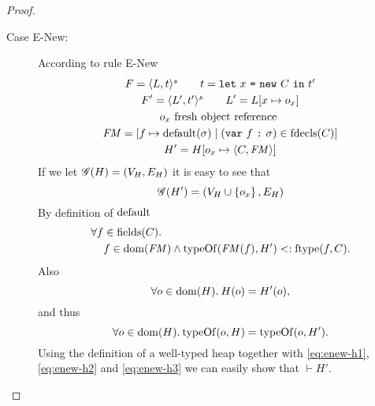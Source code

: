 \begin{proof}
\begin{description}
\begin{description}
\begin{description}
            \item[Case {\sc E-New}:] According to rule {\sc E-New}
              \begin{equation} \label{eq:enew1}
                \begin{gathered} 
                  F = \mbox{$\langle L, t \rangle^s$} \quad\quad t = \mbox{\mdseries\texttt{let}~$x$~\texttt{=}~$\mbox{\mdseries\texttt{new}~$C$}$~\texttt{in}~$t'$} \\
                  F' = \mbox{$\langle L', t' \rangle^s$} \quad\quad L' = L[x \mapsto o_x] \\
                  o_x \text{ fresh object reference } \\
                  \mathit{FM} = [f \mapsto \mbox{$\mathrm{default}$}(\sigma) \mid (\mbox{\mdseries\texttt{var}~$f$~\texttt{:}~$\sigma$}) \in
                  \mbox{$\mathrm{fdecls}$}(C)] \\
                  H' = H[o_x \mapsto \mbox{$\langle C, \mathit{FM} \rangle$}]
                \end{gathered}
              \end{equation}
              If we let $\mathscr{G}(H) = (V_H, E_H)$ it is easy to see that
              \begin{equation}
                \mathscr{G}(H') = ( V_H \cup \left\{ o_x \right\}, E_H )
              \end{equation}
              By definition of $\mbox{$\mathrm{default}$}$
              \begin{equation} \label{eq:enew-h1}
                \begin{aligned}
                  \forall f &\in \mbox{$\mathrm{fields}$}(C).\\
                  &f \in \mbox{$\mathrm{dom}$}(\mathit{FM}) \land \mbox{$\mathrm{typeOf}$}(\mathit{FM}(f), H') <: \mbox{$\mathrm{ftype}$}(f, C).
                \end{aligned}
              \end{equation}
              Also
              \begin{equation}
                \forall o \in \mbox{$\mathrm{dom}$}(H). \: H(o) = H'(o) \label{eq:enew-h2},
              \end{equation}
              and thus
              \begin{equation}
                \forall o \in \mbox{$\mathrm{dom}$}(H). \: \mbox{$\mathrm{typeOf}$}(o, H) = \mbox{$\mathrm{typeOf}$}(o, H').
                \label{eq:enew-h3}
              \end{equation}
              Using the definition of a well-typed heap together with
              \eqref{eq:enew-h1}, \eqref{eq:enew-h2} and \eqref{eq:enew-h3} we
              can easily show that $\vdash H'$.


\end{description}
\end{description}
\end{description}
\end{proof}
